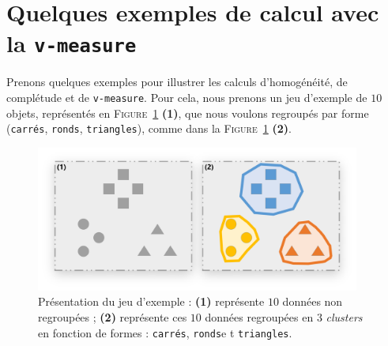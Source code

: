 	\section{Quelques exemples de calcul avec la \texttt{v-measure}}
	\label{annex:D.2-ANNEXE-EVALUATION-CLUSTERING-EXEMPLE-VMEASURE}
		
		Prenons quelques exemples pour illustrer les calculs d'homogénéité, de complétude et de \texttt{v-measure}.
		Pour cela, nous prenons un jeu d'exemple de $10$ objets, représentés en \textsc{Figure~\ref{figure:D.2-ANNEXE-EVALUATION-CLUSTERING-EXEMPLE-VMEASURE-0-PRESENTATION}} \textbf{(1)}, que nous voulons regroupés par forme (\texttt{carrés}, \texttt{ronds}, \texttt{triangles}), comme dans la \textsc{Figure~\ref{figure:D.2-ANNEXE-EVALUATION-CLUSTERING-EXEMPLE-VMEASURE-0-PRESENTATION}} \textbf{(2)}.
		\begin{figure}[H]
			\centering
			\includegraphics[width=0.95\textwidth]{figures/annexe-vmeasure-presentation}
			\caption{
				Présentation du jeu d'exemple :
				\textbf{(1)} représente $10$ données non regroupées ;
				\textbf{(2)} représente ces $10$ données regroupées en $3$ \textit{clusters} en fonction de formes : \texttt{carrés}, \texttt{ronds}e t \texttt{triangles}.
			}
			\label{figure:D.2-ANNEXE-EVALUATION-CLUSTERING-EXEMPLE-VMEASURE-0-PRESENTATION}
		\end{figure}
		
